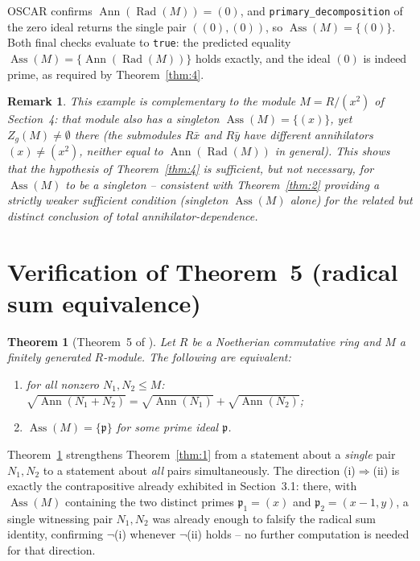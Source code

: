 \documentclass[11pt]{article}
\newtheorem{theorem}{Theorem}
\newtheorem{remark}{Remark}
\newcommand{\Ann}{\operatorname{Ann}}
\newcommand{\Rad}{\operatorname{Rad}}
\newcommand{\Ass}{\operatorname{Ass}}
\begin{document}
OSCAR confirms $\Ann(\Rad(M))=(0)$, and \texttt{primary\_decomposition}
of the zero ideal returns the single pair $((0),(0))$, so
$\Ass(M)=\{(0)\}$. Both final checks evaluate to \texttt{true}: the
predicted equality $\Ass(M)=\{\Ann(\Rad(M))\}$ holds exactly, and the
ideal $(0)$ is indeed prime, as required by Theorem~\ref{thm:4}.

\begin{remark}
This example is complementary to the module $M=R/(x^2)$ of
Section~4: that module also has a singleton $\Ass(M)=\{(x)\}$, yet
$Z_g(M)\neq\emptyset$ there (the submodules $R\bar x$ and $R\bar y$ have
different annihilators $(x)\neq(x^2)$, neither equal to $\Ann(\Rad(M))$
in general). This shows that the hypothesis of Theorem~\ref{thm:4} is
sufficient, but not necessary, for $\Ass(M)$ to be a singleton --
consistent with Theorem~\ref{thm:2} providing a strictly weaker
sufficient condition (singleton $\Ass(M)$ alone) for the related but
distinct conclusion of total annihilator-dependence.
\end{remark}

\section{Verification of Theorem~5 (radical sum equivalence)}
\label{sec:thm5}

\begin{theorem}[Theorem~5 of \cite{pekin-ozkaya-2026}]
\label{thm:5}
Let $R$ be a Noetherian commutative ring and $M$ a finitely generated
$R$-module. The following are equivalent:
\begin{enumerate}
\item[(i)] for all nonzero $N_1,N_2\le M$: $\sqrt{\Ann(N_1+N_2)} =
\sqrt{\Ann(N_1)}+\sqrt{\Ann(N_2)}$;
\item[(ii)] $\Ass(M)=\{\mathfrak p\}$ for some prime ideal $\mathfrak p$.
\end{enumerate}
\end{theorem}

Theorem~\ref{thm:5} strengthens Theorem~\ref{thm:1} from a statement about
a \emph{single} pair $N_1,N_2$ to a statement about \emph{all} pairs
simultaneously. The direction (i)$\Rightarrow$(ii) is exactly the
contrapositive already exhibited in Section~3.1: there, with $\Ass(M)$
containing the two distinct primes $\mathfrak p_1=(x)$ and
$\mathfrak p_2=(x-1,y)$, a single witnessing pair $N_1,N_2$ was already
enough to falsify the radical sum identity, confirming $\neg$(i) whenever
$\neg$(ii) holds -- no further computation is needed for that direction.
\end{document}
